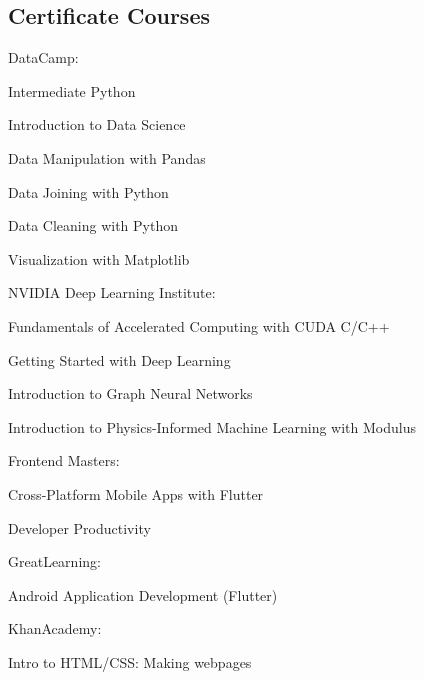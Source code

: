 \documentclass[]{m abbas resume' 2022}
\begin{document}
\begin{minipage}[t]{0.51\textwidth}
    \subsection{Certificate Courses}
    DataCamp:
    \begin{tightemize}
        \item Intermediate Python
        \item Introduction to Data Science
        \item Data Manipulation with Pandas
        \item Data Joining with Python
        \item Data Cleaning with Python
        \item Visualization with Matplotlib
    \end{tightemize}
    NVIDIA Deep Learning Institute:
    \begin{tightemize}
        \item Fundamentals of Accelerated Computing with CUDA C/C++
        \item Getting Started with Deep Learning
        \item Introduction to Graph Neural Networks
        \item Introduction to Physics-Informed Machine Learning with Modulus
    \end{tightemize}
    Frontend Masters:
    \begin{tightemize}
        \item Cross-Platform Mobile Apps with Flutter
        \item Developer Productivity
    \end{tightemize}
    GreatLearning:
    \begin{tightemize}
        \item Android Application Development (Flutter)
    \end{tightemize}
    KhanAcademy:
    \begin{tightemize}
        \item Intro to HTML/CSS: Making webpages
    \end{tightemize}
    \sectionsep
    

\end{minipage}
\end{document}
